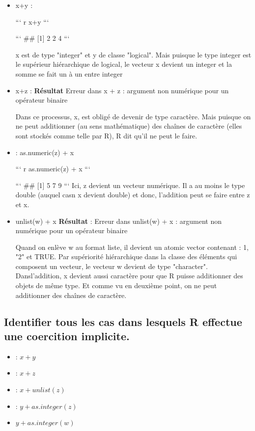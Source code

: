 \documentclass[
  11pt,
]{article}
\begin{document}
\begin{itemize}
  \item x+y : 

``` r
x+y
```

```
## [1] 2 2 4
```

x est de type  "integer" et y de classe "logical". Mais puisque le type integer est le supérieur hiérarchique de logical, le vecteur x devient un integer et la somme se fait un à un entre integer
   
   \item x+z : \textbf{Résultat} Erreur dans x + z : argument non numérique     pour un opérateur binaire

Dans ce processus, x, est obligé de devenir de type caractère. Mais puisque on ne peut additionner (au sens mathématique) des chaînes de caractère (elles sont stockés comme telle par R), R dit qu'il ne peut le faire. 
  
  \item :  as.numeric(z) + x

``` r
 as.numeric(z) + x
```

```
## [1] 5 7 9
```
  Ici, z devient un vecteur numérique. Il a au moins le type double (auquel casn x devient double) et donc, l'addition peut se faire entre z et x.  
  
  \item  unlist(w) + x \textbf{Résultat} : Erreur dans unlist(w) + x : argument non numérique pour un opérateur binaire

  Quand on enlève w au format liste, il devient un atomic vector contenant : 1, "2" et TRUE. Par supériorité hiérarchique dans la classe des éléments qui composent un vecteur, le vecteur w devient de type "character". Dansl'addition, x devient aussi caractère pour que R puisse additionner des objets de même type. Et comme vu en deuxième point, on ne peut additionner des chaînes de caractère.
\end{itemize}

\subsection{Identifier tous les cas dans lesquels R effectue une
coercition
implicite.}\label{identifier-tous-les-cas-dans-lesquels-r-effectue-une-coercition-implicite.}

\begin{itemize}
\item : $x+y$ 
\item : $x+z$
\item : $x+unlist(z)$ 
\item : $y+as.integer(z)$ 
\item $y+as.integer(w)$ 
\end{itemize}
\end{document}
